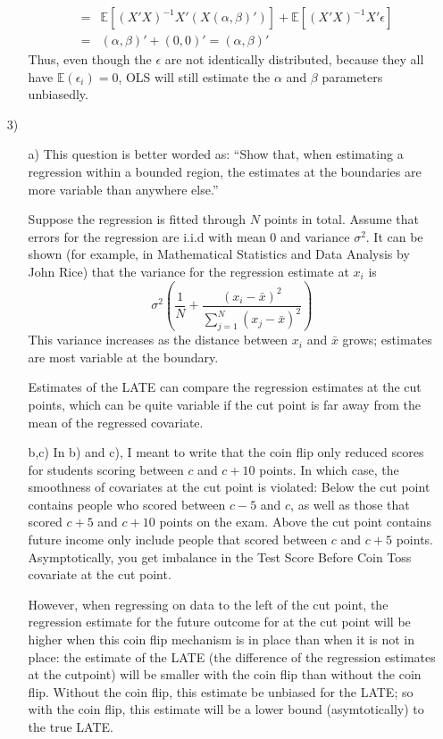 \documentclass{article}
\def\E{{\mathbb E}}
\begin{document}
\begin{itemize}
\begin{itemize}
\begin{eqnarray*}
       &=& \E[(X'X)^{-1}X'(X(\alpha, \beta)')] +\E[(X'X)^{-1}X'\epsilon] \\
       & = & (\alpha,\beta)' + (0,0)' = (\alpha,\beta)'  
     \end{eqnarray*}
     Thus, even though the $\epsilon$ are not identically distributed, 
     because they all have $\E(\epsilon_i) = 0$, OLS will still 
     estimate the $\alpha$ and $\beta$ parameters unbiasedly.
  \end{itemize}
  \item[3)]
  \begin{itemize}
    \item[a)]  This question is better worded as:
      ``Show that, when estimating a regression within a bounded region,
        the estimates at the boundaries are more variable than anywhere else.''
       
       Suppose the regression is fitted through $N$ points in total.
       Assume that errors for the regression are i.i.d with mean 0 and
       variance $\sigma^2$.
       It can be shown 
       (for example, in Mathematical Statistics and Data Analysis by John Rice) 
       that the variance for the regression estimate at $x_i$ is
       $$
         \sigma^2\left(\frac 1 N + \frac {(x_i - \bar x)^2}{\sum_{j=1}^N (x_j - \bar x)^2}\right)
       $$
       This variance increases as the distance between $x_i$ and $\bar x$ grows;
       estimates are most variable at the boundary.
       
       Estimates of the LATE can compare the regression estimates at the cut points, 
       which can be quite variable if the cut point is far away from the mean of the 
       regressed covariate.
     \item[b,c)] In b) and c), I meant to write that the coin flip only reduced scores for
       students scoring between $c$ and $c + 10$ points.  
       In which case, the smoothness of covariates at the cut point is violated:
       Below the cut point contains people who scored between
       $c-5$ and $c$, as well as those that scored $c+5$ and $c+10$ points on
       the exam.  
       Above the cut point contains future income only include people that scored 
       between $c$ and $c+5$ points.
       Asymptotically, you get imbalance in the Test Score Before Coin Toss covariate 
       at the cut point.
       
       However, when regressing on data to the left of the cut point, 
       the regression estimate for the future outcome for at the cut point will be higher
       when this coin flip mechanism is in place than when it is not in place:
       the estimate of the LATE (the difference of the regression estimates at the cutpoint)
       will be smaller with the coin flip than without the coin flip.
       Without the coin flip, this estimate be unbiased for the LATE; 
       so with the coin flip, this estimate will be a lower bound (asymtotically) to 
       the true LATE.
       

\end{itemize}
\end{itemize}
\end{document}
